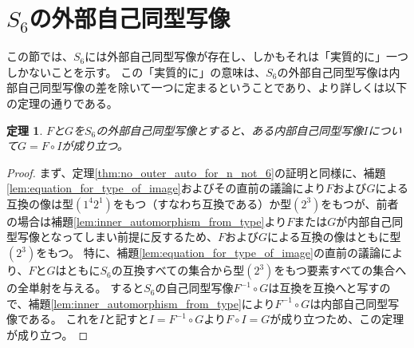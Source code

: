 \documentclass[11pt]{jarticle}
\newtheorem{theorem}{定理}
\begin{document}
\section{$S_6$の外部自己同型写像}
\label{sec:out_S6}

この節では、$S_6$には外部自己同型写像が存在し、しかもそれは「実質的に」一つしかないことを示す。
この「実質的に」の意味は、$S_6$の外部自己同型写像は内部自己同型写像の差を除いて一つに定まるということであり、より詳しくは以下の定理の通りである。

\begin{theorem}
\label{thm:unique_outer_auto_for_S6}
$F$と$G$を$S_6$の外部自己同型写像とすると、ある内部自己同型写像$I$について$G = F \circ I$が成り立つ。
\end{theorem}
\begin{proof}
まず、定理\ref{thm:no_outer_auto_for_n_not_6}の証明と同様に、補題\ref{lem:equation_for_type_of_image}およびその直前の議論により$F$および$G$による互換の像は型$(1^4 2^1)$をもつ（すなわち互換である）か型$(2^3)$をもつが、前者の場合は補題\ref{lem:inner_automorphism_from_type}より$F$または$G$が内部自己同型写像となってしまい前提に反するため、$F$および$G$による互換の像はともに型$(2^3)$をもつ。
特に、補題\ref{lem:equation_for_type_of_image}の直前の議論により、$F$と$G$はともに$S_6$の互換すべての集合から型$(2^3)$をもつ要素すべての集合への全単射を与える。
すると$S_6$の自己同型写像$F^{-1} \circ G$は互換を互換へと写すので、補題\ref{lem:inner_automorphism_from_type}により$F^{-1} \circ G$は内部自己同型写像である。
これを$I$と記すと$I = F^{-1} \circ G$より$F \circ I = G$が成り立つため、この定理が成り立つ。
\end{proof}
\end{document}
